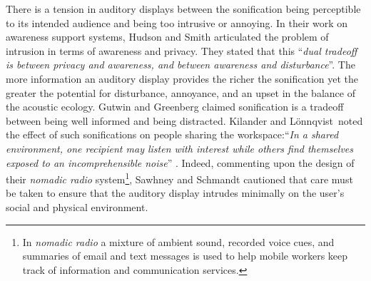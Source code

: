 \documentclass[runningheads]{llncs}
\newcommand{\killonq}{Kilander and L\"{o}nnqvist}
\begin{document}
There is a tension in auditory displays between the sonification being perceptible to its intended audience and being too intrusive or annoying. In their work on awareness support systems, Hudson and Smith \cite{Hudson:1996} articulated the problem of intrusion in terms of awareness and privacy. They stated that this ``\emph{dual tradeoff is between privacy and awareness, and between awareness and disturbance}''. The more information an auditory display provides the richer the sonification yet the greater the potential for disturbance, annoyance, and an upset in the balance of the acoustic ecology. Gutwin and Greenberg \cite{Gutwin:1995} claimed sonification is a tradeoff between being well informed and being distracted. \killonq \ noted the effect of such sonifications on people sharing the workspace:``\emph{In a shared environment, one recipient may listen with interest while others find themselves exposed to an incomprehensible noise}'' \cite{Kilander:2002}. Indeed, commenting upon the design of their \emph{nomadic radio} system\footnote{In  \emph{nomadic radio} a mixture of ambient sound, recorded voice cues, and summaries of email and text messages is used to help mobile workers keep track of information and communication services.}, Sawhney and Schmandt \cite{Sawhney:1999,Sawhney:2000} cautioned that care must be taken to ensure that the auditory display intrudes minimally on the user's social and physical environment.
\end{document}
